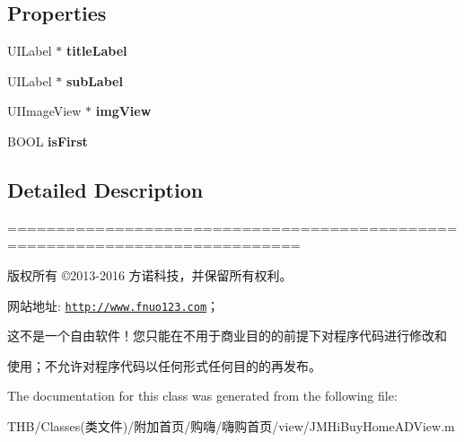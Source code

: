 \subsection*{Properties}
\begin{DoxyCompactItemize}
\item 
\mbox{\label{interface_j_m_hi_buy_home_a_d_sub_view_a91b04816b500b190f5ba8a70d7cc0784}} 
U\+I\+Label $\ast$ {\bfseries title\+Label}
\item 
\mbox{\label{interface_j_m_hi_buy_home_a_d_sub_view_a6f82136855929bdbd740be4c533a3b74}} 
U\+I\+Label $\ast$ {\bfseries sub\+Label}
\item 
\mbox{\label{interface_j_m_hi_buy_home_a_d_sub_view_a02df96a088e9c42daa5054570a075c58}} 
U\+I\+Image\+View $\ast$ {\bfseries img\+View}
\item 
\mbox{\label{interface_j_m_hi_buy_home_a_d_sub_view_ad101749e5d026b0197e7414e7fafdaf7}} 
B\+O\+OL {\bfseries is\+First}
\end{DoxyCompactItemize}


\subsection{Detailed Description}
============================================================================

版权所有 ©2013-\/2016 方诺科技，并保留所有权利。

网站地址\+: \href{http://www.fnuo123.com}{\tt http\+://www.\+fnuo123.\+com}； 



这不是一个自由软件！您只能在不用于商业目的的前提下对程序代码进行修改和

使用；不允许对程序代码以任何形式任何目的的再发布。 

 

The documentation for this class was generated from the following file\+:\begin{DoxyCompactItemize}
\item 
T\+H\+B/\+Classes(类文件)/附加首页/购嗨/嗨购首页/view/J\+M\+Hi\+Buy\+Home\+A\+D\+View.\+m\end{DoxyCompactItemize}

